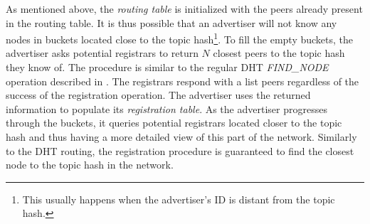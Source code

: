 As mentioned above, the \emph{routing table} is initialized with the peers already present in the routing table. It is thus possible that an advertiser will not know any nodes in buckets located close to the topic hash\footnote{This usually happens when the advertiser's ID is distant from the topic hash.}. 
To fill the empty buckets, the advertiser asks potential registrars to return $N$ closest peers to the topic hash they know of. 
The procedure is similar to the regular DHT \emph{FIND\_NODE} operation described in . 
The registrars respond with a list peers regardless of the success of the registration operation. 
The advertiser uses the returned information to populate its \emph{registration table}. 
As the advertiser progresses through the buckets, it queries potential registrars located closer to the topic hash and thus having a more detailed view of this part of the network. 
Similarly to the DHT routing, the registration procedure is guaranteed to find the closest node to the topic hash in the network. 







